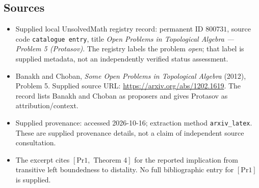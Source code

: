 \documentclass[11pt]{article}
\begin{document}
\subsection{Sources}
\begin{itemize}
\item Supplied local UnsolvedMath registry record: permanent ID \(800731\), source code \texttt{catalogue entry}, title \emph{Open Problems in Topological Algebra --- Problem 5 (Protasov)}. The registry labels the problem \emph{open}; that label is supplied metadata, not an independently verified status assessment.
\item Banakh and Choban, \emph{Some Open Problems in Topological Algebra} (2012), Problem 5. Supplied source URL: \url{https://arxiv.org/abs/1202.1619}. The record lists Banakh and Choban as proposers and gives Protasov as attribution/context.
\item Supplied provenance: accessed 2026-10-16; extraction method \texttt{arxiv\_latex}. These are supplied provenance details, not a claim of independent source consultation.
\item The excerpt cites \([\mathrm{Pr1},\text{ Theorem }4]\) for the reported implication from transitive left boundedness to distality. No full bibliographic entry for \([\mathrm{Pr1}]\) is supplied.
\end{itemize}
\end{document}
